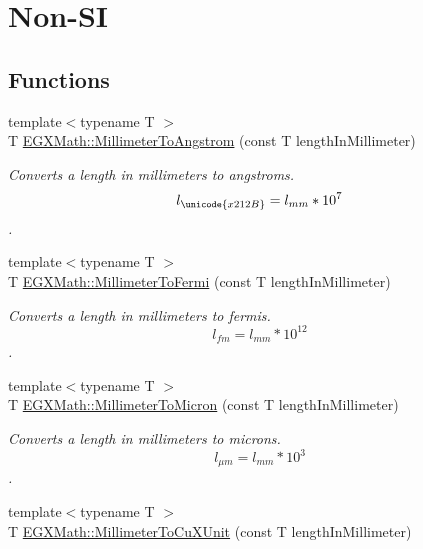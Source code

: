 \hypertarget{group___e_g_x_math-_conversions-_length_conversions-_s_i-_millimeter-_non-_s_i}{}\section{Non-\/\+SI}
\label{group___e_g_x_math-_conversions-_length_conversions-_s_i-_millimeter-_non-_s_i}
\subsection*{Functions}
\begin{DoxyCompactItemize}
\item 
{\footnotesize template$<$typename T $>$ }\\T \mbox{\hyperlink{group___e_g_x_math-_conversions-_length_conversions-_s_i-_millimeter-_non-_s_i_ga40e4659f4689e5be54f8e28fd8ce0008}{E\+G\+X\+Math\+::\+Millimeter\+To\+Angstrom}} (const T length\+In\+Millimeter)
\begin{DoxyCompactList}\small\item\em Converts a length in millimeters to angstroms. \[ l_{\unicode{x212B}}=l_{mm} * 10^{7} \]. \end{DoxyCompactList}\item 
{\footnotesize template$<$typename T $>$ }\\T \mbox{\hyperlink{group___e_g_x_math-_conversions-_length_conversions-_s_i-_millimeter-_non-_s_i_gaeb57dff8b2e092b5a655ffdd9960897d}{E\+G\+X\+Math\+::\+Millimeter\+To\+Fermi}} (const T length\+In\+Millimeter)
\begin{DoxyCompactList}\small\item\em Converts a length in millimeters to fermis. \[ l_{fm}=l_{mm} * 10^{12} \]. \end{DoxyCompactList}\item 
{\footnotesize template$<$typename T $>$ }\\T \mbox{\hyperlink{group___e_g_x_math-_conversions-_length_conversions-_s_i-_millimeter-_non-_s_i_ga47eac74d2eeec20afc801e61d53f67a0}{E\+G\+X\+Math\+::\+Millimeter\+To\+Micron}} (const T length\+In\+Millimeter)
\begin{DoxyCompactList}\small\item\em Converts a length in millimeters to microns. \[ l_{\mu m}=l_{mm} * 10^{3} \]. \end{DoxyCompactList}\item 
{\footnotesize template$<$typename T $>$ }\\T \mbox{\hyperlink{group___e_g_x_math-_conversions-_length_conversions-_s_i-_millimeter-_non-_s_i_gaa9a94e1f42047955530f673047c4370b}{E\+G\+X\+Math\+::\+Millimeter\+To\+Cu\+X\+Unit}} (const T length\+In\+Millimeter)

\end{DoxyCompactItemize}
